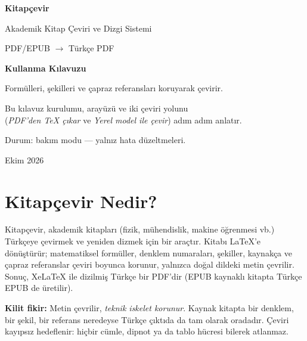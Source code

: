 \documentclass[11pt,a4paper]{article}
\begin{document}
\begin{titlepage}
\centering
\vspace*{3.5cm}
{\Huge\bfseries\color{vurgu} Kitapçevir\par}
\vspace{0.6cm}
{\Large Akademik Kitap Çeviri ve Dizgi Sistemi\par}
\vspace{0.3cm}
{\large PDF/EPUB \(\rightarrow\) Türkçe PDF\par}
\vspace{2cm}
{\huge\bfseries Kullanma Kılavuzu\par}
\vspace{1.5cm}
{\large Formülleri, şekilleri ve çapraz referansları koruyarak çevirir.\par}
\vfill
{\small Bu kılavuz kurulumu, arayüzü ve iki çeviri yolunu\\
(\emph{PDF'den TeX çıkar} ve \emph{Yerel model ile çevir}) adım adım anlatır.\par}
\vspace{0.5cm}
{\small Durum: bakım modu --- yalnız hata düzeltmeleri.\par}
\vspace{0.3cm}
{\small Ekim 2026\par}
\vspace{1cm}
\end{titlepage}

\tableofcontents
\newpage

\section{Kitapçevir Nedir?}

Kitapçevir, akademik kitapları (fizik, mühendislik, makine öğrenmesi vb.)
Türkçeye çevirmek ve yeniden dizmek için bir araçtır. Kitabı LaTeX'e
dönüştürür; matematiksel formüller, denklem numaraları, şekiller, kaynakça ve
çapraz referanslar çeviri boyunca korunur, yalnızca doğal dildeki metin
çevrilir. Sonuç, XeLaTeX ile dizilmiş Türkçe bir PDF'dir (EPUB kaynaklı kitapta
Türkçe EPUB de üretilir).

\begin{notkutu}
\textbf{Kilit fikir:} Metin çevrilir, \emph{teknik iskelet korunur}. Kaynak
kitapta bir denklem, bir şekil, bir referans neredeyse Türkçe çıktıda da tam
olarak oradadır. Çeviri kayıpsız hedeflenir: hiçbir cümle, dipnot ya da tablo
hücresi bilerek atlanmaz.
\end{notkutu}
\end{document}
